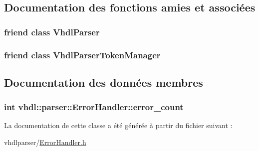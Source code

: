 \subsection{Documentation des fonctions amies et associées}
\hypertarget{classvhdl_1_1parser_1_1_error_handler_a8bbb7acf78e67f3b3706943bf268ceed}{}
\subsubsection[{Vhdl\+Parser}]{\setlength{\rightskip}{0pt plus 5cm}friend class {\bf Vhdl\+Parser}\hspace{0.3cm}{\ttfamily [friend]}}\label{classvhdl_1_1parser_1_1_error_handler_a8bbb7acf78e67f3b3706943bf268ceed}
\hypertarget{classvhdl_1_1parser_1_1_error_handler_aff28441094086f5cbf8ee8f34a8bc9a4}{}
\subsubsection[{Vhdl\+Parser\+Token\+Manager}]{\setlength{\rightskip}{0pt plus 5cm}friend class {\bf Vhdl\+Parser\+Token\+Manager}\hspace{0.3cm}{\ttfamily [friend]}}\label{classvhdl_1_1parser_1_1_error_handler_aff28441094086f5cbf8ee8f34a8bc9a4}


\subsection{Documentation des données membres}
\hypertarget{classvhdl_1_1parser_1_1_error_handler_ada8cb3fd4fa2dead863dc00edc1b9587}{}
\subsubsection[{error\+\_\+count}]{\setlength{\rightskip}{0pt plus 5cm}int vhdl\+::parser\+::\+Error\+Handler\+::error\+\_\+count\hspace{0.3cm}{\ttfamily [protected]}}\label{classvhdl_1_1parser_1_1_error_handler_ada8cb3fd4fa2dead863dc00edc1b9587}


La documentation de cette classe a été générée à partir du fichier suivant \+:\begin{DoxyCompactItemize}
\item 
vhdlparser/\hyperlink{_error_handler_8h}{Error\+Handler.\+h}\end{DoxyCompactItemize}
